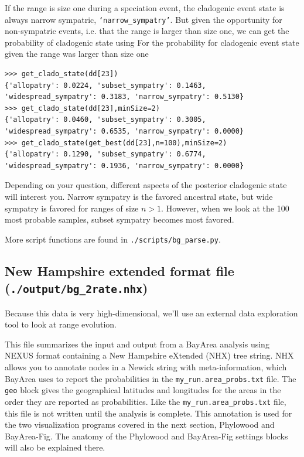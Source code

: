 If the range is size one during a speciation event, the cladogenic event state is always narrow sympatric, {\tt `narrow\_sympatry'}.
But given the opportunity for non-sympatric events, i.e. that the range is larger than size one, we can get the probability of cladogenic state using
For the probability for cladogenic event state given the range was larger than size one
\begin{snugshade}
\begin{lstlisting}
>>> get_clado_state(dd[23])
{'allopatry': 0.0224, 'subset_sympatry': 0.1463, 'widespread_sympatry': 0.3183, 'narrow_sympatry': 0.5130}
>>> get_clado_state(dd[23],minSize=2)
{'allopatry': 0.0460, 'subset_sympatry': 0.3005, 'widespread_sympatry': 0.6535, 'narrow_sympatry': 0.0000}
>>> get_clado_state(get_best(dd[23],n=100),minSize=2)
{'allopatry': 0.1290, 'subset_sympatry': 0.6774, 'widespread_sympatry': 0.1936, 'narrow_sympatry': 0.0000}
\end{lstlisting}
\end{snugshade}

Depending on your question, different aspects of the posterior cladogenic state will interest you.
Narrow sympatry is the favored ancestral state, but wide sympatry is favored for ranges of size $n>1$.
However, when we look at the 100 most probable samples, subset sympatry becomes most favored.

More script functions are found in {\tt ./scripts/bg\_parse.py}.

\subsection{New Hampshire extended format file (\texttt{./output/bg\_2rate.nhx})}

Because this data is very high-dimensional, we'll use an external data exploration tool to look at range evolution.

This file summarizes the input and output from a BayArea analysis using NEXUS format containing a New Hampshire eXtended (NHX) tree string.
NHX allows you to annotate nodes in a Newick string with meta-information, which BayArea uses to report the probabilities in the \texttt{my\_run.area\_probs.txt} file.
The \texttt{geo} block gives the geographical latitudes and longitudes for the areas in the order they are reported as probabilities.
Like the \texttt{my\_run.area\_probs.txt} file, this file is not written until the analysis is complete.
This annotation is used for the two visualization programs covered in the next section, Phylowood and BayArea-Fig.
The anatomy of the Phylowood and BayArea-Fig settings blocks will also be explained there.

